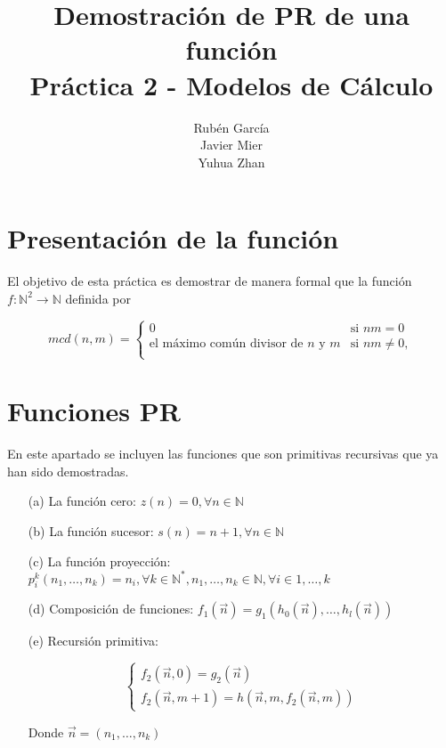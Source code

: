 \documentclass[a4paper,12pt]{article}
\title{\huge{Demostración de PR de una función} \\ \Large{Práctica 2 - Modelos de Cálculo}}
\author{Rubén García \\ Javier Mier \\ Yuhua Zhan}
\date{}
\begin{document}
\maketitle

\section{Presentación de la función}

El objetivo de esta práctica es demostrar de manera formal que la función
$f: \mathbb{N} ^{2}\rightarrow \mathbb {N}$ definida por

$$mcd(n,m)=
\begin{cases}
    0&\text{si }nm = 0\\
    \text{el máximo común divisor de  $n$ y $m$}&\text{si }nm \neq 0,\\
\end{cases}
$$

\section{Funciones PR}

En este apartado se incluyen las funciones que son primitivas recursivas que ya han sido demostradas.

\begin{itemize}
        \item[(a)] \hypertarget{func_a}{La función cero: $z(n) = 0, \forall n \in \mathbb{N}$}
        \item[(b)] \hypertarget{func_b}{La función sucesor: $s(n) = n + 1, \forall n \in \mathbb{N}$}
        \item[(c)] \hypertarget{func_c}{La función proyección: $p^{k}_{i} (n_{1}, \ldots , n_{k}) = n_{i}, \forall k \in \mathbb{N}^*, n_{1}, \ldots , n_{k} \in \mathbb{N}, \forall i \in {1, \ldots, k}$}
        \item[(d)] \hypertarget{func_d}{Composición de funciones: $f_{1}(\vec{n}) = g_{1}(h_{0}(\vec{n}), \ldots, h_{l}(\vec{n}))$}
        \item[(e)] \hypertarget{func_e}{Recursión primitiva:}
        
        $$\begin{cases}
            f_{2}(\vec{n},0) = g_{2}(\vec{n}) \\
            f_{2}(\vec{n},m+1) = h(\vec{n},m,f_{2}(\vec{n},m))
        \end{cases}$$
        
        Donde $\vec{n} = (n_{1}, \ldots , n_{k})$
\end{itemize}
\end{document}

